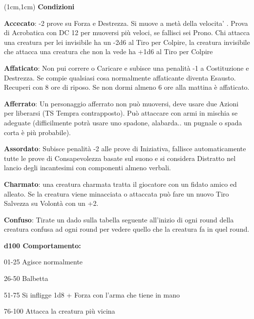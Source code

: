 \documentclass[a4paper,12 pt,openany]{book}
\begin{document}
	\center
	
	\begin{textblock*}{19 cm}(1cm,1cm) %
		\flushleft
		\textbf{Condizioni}\\
		\footnotesize 	
		
		\begin{multicols}{2}
			
\textbf{Accecato}: -2 prove su Forza e Destrezza. 
Si muove a metà della velocita' . Prova di Acrobatica con DC 12 per muoversi più veloci, se fallisci sei Prono.
Chi attacca una creatura per lei invisibile ha un -2d6 al Tiro per Colpire, la creatura invisibile che attacca una creatura che non la vede ha +1d6 al Tiro per Colpire

			
\textbf{Affaticato}: Non pui correre o Caricare e subisce una penalità -1 a Costituzione e Destrezza. Se compie qualsiasi cosa normalmente affaticante diventa Esausto.
Recuperi con 8 ore di riposo. Se non dormi almeno 6 ore alla mattina è affaticato.
			
\textbf{Afferrato}: Un personaggio afferrato non può muoversi, deve usare due Azioni per liberarsi (TS Tempra contrapposto). Può attaccare con armi in mischia se adeguate (difficilmente potrà usare uno spadone, alabarda.. un pugnale o spada corta è più probabile).
			
\textbf{Assordato}: Subisce penalità -2 alle prove di Iniziativa, fallisce automaticamente tutte le prove di Consapevolezza basate sul suono e si considera Distratto nel lancio degli incantesimi con componenti almeno verbali.
			
\textbf{Charmato}: una creatura charmata tratta il giocatore con un fidato amico ed alleato. Se la creatura viene minacciata o attaccata può fare un nuovo Tiro Salvezza su Volontà con un +2.
			
\textbf{Confuso}:  Tirate un dado sulla tabella seguente all'inizio di ogni round della creatura confusa ad ogni round per vedere quello che la creatura fa in quel round.
			
\textbf{d100 Comportamento:}
			
01-25 Agisce normalmente
			
26-50 Balbetta
			
51-75 Si infligge 1d8 + Forza con l'arma che tiene in mano
		
76-100 Attacca la creatura più vicina 
			

\end{multicols}
\end{textblock*}
\end{document}
